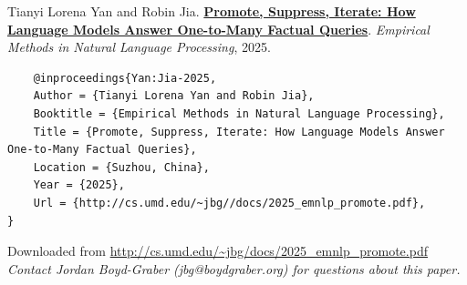 \documentclass[a4paper]{article}
\begin{document}
    Tianyi Lorena Yan and Robin Jia.  {\bf \href{http://cs.umd.edu/~jbg//docs/2025_emnlp_promote.pdf}{Promote, Suppress, Iterate: How Language Models Answer One-to-Many Factual Queries}}.  \emph{Empirical Methods in Natural Language Processing}, 2025.



    \vspace{5cm}

    \begin{verbatim}
    @inproceedings{Yan:Jia-2025,
	Author = {Tianyi Lorena Yan and Robin Jia},
	Booktitle = {Empirical Methods in Natural Language Processing},
	Title = {Promote, Suppress, Iterate: How Language Models Answer One-to-Many Factual Queries},
	Location = {Suzhou, China},
	Year = {2025},
	Url = {http://cs.umd.edu/~jbg//docs/2025_emnlp_promote.pdf},
}

    \end{verbatim}

    

    

    

    \vspace{3cm}
    Downloaded from \url{http://cs.umd.edu/~jbg/docs/2025_emnlp_promote.pdf}  \\

    \vspace{2cm}
    \textit{Contact Jordan Boyd-Graber (jbg@boydgraber.org) for questions about this paper.}

    

    
\end{document}
